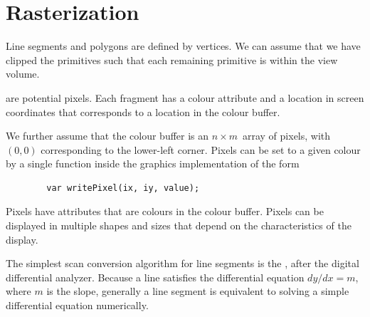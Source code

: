 \documentclass[../COS3712_Notes.tex]{subfiles}
\begin{document}
    \section{Rasterization}
      Line segments and polygons are defined by vertices.
      We can assume that we have clipped the primitives such that each remaining primitive
      is within the view volume.

       are potential pixels.
      Each fragment has a colour attribute and a location in screen coordinates
      that corresponds to a location in the colour buffer.

      We further assume that the colour buffer is an $n \times m$~array of pixels,
      with $(0, 0)$ corresponding to the lower-left corner.
      Pixels can be set to a given colour by a single function inside the graphics implementation
      of the form
      \begin{verbatim}
        var writePixel(ix, iy, value);
      \end{verbatim}

      Pixels have attributes that are colours in the colour buffer.
      Pixels can be displayed in multiple shapes and sizes that depend on the characteristics
      of the display.

      The simplest scan conversion algorithm for line segments is the ,
      after the digital differential analyzer.
      Because a line satisfies the differential equation $dy/dx = m$, where $m$ is the slope,
      generally a line segment is equivalent to solving a simple differential equation
      numerically.
\end{document}
